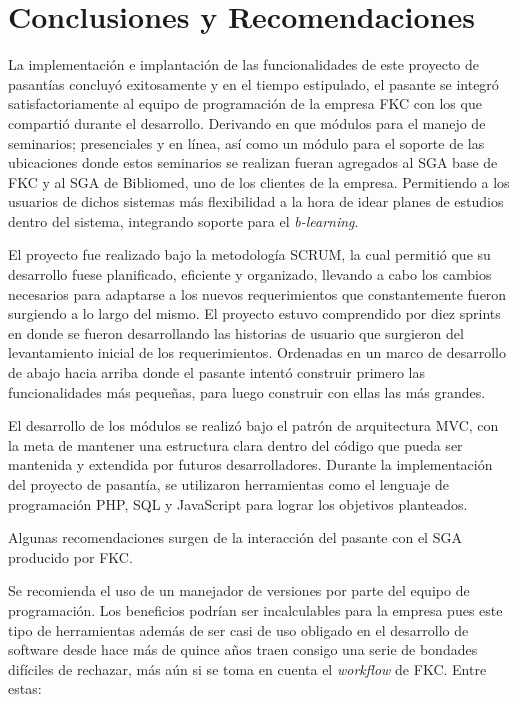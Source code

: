 \chapter*{Conclusiones y Recomendaciones}
\thispagestyle{empty} %
 

La implementación e implantación de las funcionalidades de este proyecto de pasantías concluyó exitosamente y en el tiempo estipulado, el pasante se integró satisfactoriamente al equipo de programación de la empresa \gls{FKC} con los que compartió durante el desarrollo. Derivando en que módulos para el manejo de seminarios; presenciales y en línea, así como un módulo para el soporte de las ubicaciones donde estos seminarios se realizan fueran agregados al \gls{SGA} base de FKC y al \gls{SGA} de Bibliomed, uno de los clientes de la empresa. Permitiendo a los usuarios de dichos sistemas más flexibilidad a la hora de idear planes de estudios dentro del sistema, integrando soporte para el \emph{b-learning}.

El proyecto fue realizado bajo la metodología SCRUM, la cual permitió que su desarrollo fuese planificado, eficiente y organizado, llevando a cabo los cambios necesarios para adaptarse a los nuevos requerimientos que constantemente fueron surgiendo a lo largo del mismo. El proyecto estuvo comprendido por diez sprints en donde se fueron desarrollando las historias de usuario que surgieron del levantamiento inicial de los requerimientos. Ordenadas en un marco de desarrollo de abajo hacia arriba donde el pasante intentó construir primero las funcionalidades más pequeñas, para luego construir con ellas las más grandes.

El desarrollo de los módulos se realizó bajo el patrón de arquitectura \gls{MVC}, con la meta de mantener una estructura clara dentro del código que pueda ser mantenida y extendida por futuros desarrolladores. Durante la implementación del proyecto de pasantía, se utilizaron herramientas como el lenguaje de programación \gls{PHP}, \gls{SQL} y JavaScript para lograr los objetivos planteados.

Algunas recomendaciones surgen de la interacción del pasante con el \gls{SGA} producido por \gls{FKC}.

Se recomienda el uso de un manejador de versiones por parte del equipo de programación. Los beneficios podrían ser incalculables para la empresa pues este tipo de herramientas además de ser casi de uso obligado en el desarrollo de software desde hace más de quince años traen consigo una serie de bondades difíciles de rechazar, más aún si se toma en cuenta el \emph{workflow} de FKC. Entre estas:

